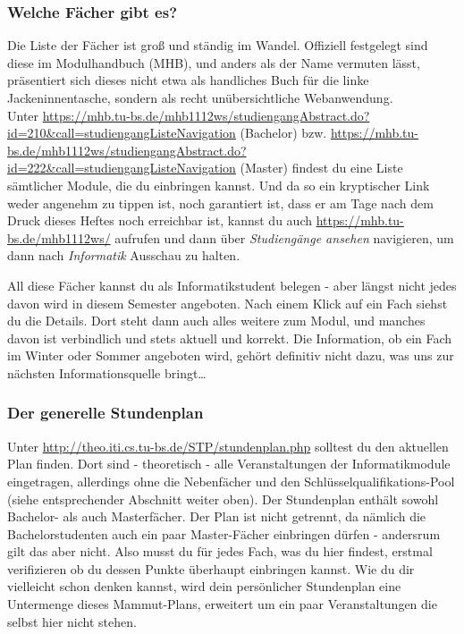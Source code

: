 \begin{multicols}{2}
\subsubsection{Welche Fächer gibt es?}
	Die Liste der Fächer ist groß und ständig im Wandel. Offiziell festgelegt sind diese im Modulhandbuch (MHB), und anders als der Name vermuten lässt, präsentiert sich dieses nicht etwa als handliches Buch für die linke Jackeninnentasche, sondern als recht unübersichtliche Webanwendung. \\ Unter \url{https://mhb.tu-bs.de/mhb1112ws/studiengangAbstract.do?id=210&call=studiengangListeNavigation} (Bachelor) bzw. \url{https://mhb.tu-bs.de/mhb1112ws/studiengangAbstract.do?id=222&call=studiengangListeNavigation} (Master) findest du eine Liste sämtlicher Module, die du  einbringen kannst. Und da so ein kryptischer Link weder angenehm zu tippen ist, noch garantiert ist, dass er am Tage nach dem Druck dieses Heftes noch erreichbar ist, kannst du auch \url{https://mhb.tu-bs.de/mhb1112ws/} aufrufen und dann über \emph{Studiengänge ansehen} navigieren, um dann nach \emph{Informatik} Ausschau zu halten.

	All diese Fächer kannst du als Informatikstudent belegen - aber längst nicht jedes davon wird in diesem Semester angeboten. Nach einem Klick auf ein Fach siehst du die Details. Dort steht dann auch alles weitere zum Modul, und manches davon ist verbindlich und stets aktuell und korrekt. Die Information, ob ein Fach im Winter oder Sommer angeboten wird, gehört definitiv nicht dazu, was uns zur nächsten Informationsquelle bringt\ldots

\subsubsection{Der generelle Stundenplan}
	Unter \url{http://theo.iti.cs.tu-bs.de/STP/stundenplan.php} solltest du den aktuellen Plan  finden. Dort sind - theoretisch - alle Veranstaltungen der Informatikmodule eingetragen, allerdings ohne die Nebenfächer und den Schlüsselqualifikations-Pool (siehe entsprechender Abschnitt weiter oben). Der Stundenplan enthält sowohl Bachelor- als auch Masterfächer. Der Plan ist nicht getrennt, da nämlich die Bachelorstudenten auch ein paar Master-Fächer einbringen dürfen - andersrum gilt das aber nicht. Also musst du für jedes Fach, was du hier findest, erstmal verifizieren ob du dessen Punkte überhaupt  einbringen kannst. Wie du dir vielleicht schon denken kannst, wird dein persönlicher Stundenplan eine Untermenge dieses Mammut-Plans, erweitert um ein paar Veranstaltungen die selbst hier nicht stehen.


\end{multicols}
